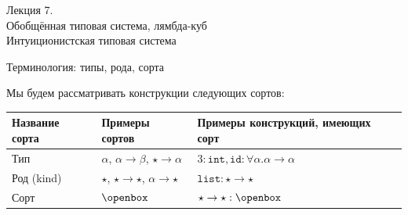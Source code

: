 \documentclass[aspectratio=169]{beamer}
\begin{document}
\newtheorem{dfn}{Определение}[section]
\newtheorem{nte}{Замечание}[section]

\newtheorem{axiom}{Аксиома}[section]
\newtheorem{thm}{Теорема}[section]
\newtheorem{lmm}[theorem]{Лемма}
\newtheorem{statement}{Утверждение}[section]
\newtheorem{oun_paragraph}{Пункт}[section]
\newtheorem{cons}{Следствие}[section]
\newtheorem*{exm}{Пример}

\newcommand{\comb}[1]{\operatorname{\bf{\textrm{#1}}}}
\newcommand{\func}[1]{\operatorname{#1}}
\newcommand{\reduction}[1]{{\color{OrangeRed}#1}}
\newcommand{\set}[1]{\left\{#1\right\}}

\def\from#1{\par \parbox{0.7\textwidth}{\par \hfill\raggedleft \it #1}} 

\begin{frame}{}
\begin{center}\Large Лекция 7.\\ Обобщённая типовая система, лямбда-куб\\Интуиционистская типовая система\end{center}
\end{frame}


\begin{frame}{Терминология: типы, рода, сорта}

Мы будем рассматривать конструкции следующих сортов:
\vspace{0.3cm}\begin{tabular}{lll}
Название сорта & Примеры сортов & Примеры конструкций, имеющих сорт\\\hline
Тип & $\alpha$, $\alpha\rightarrow\beta$, $\star\rightarrow\alpha$ & $3:\texttt{int}, \texttt{id}: \forall\alpha.\alpha\rightarrow\alpha$\\
Род (kind) & $\star$, $\star\rightarrow\star$, $\alpha\rightarrow\star$ & $\texttt{list}: \star\rightarrow\star$\\
Сорт & $\openbox$ & $\star\rightarrow\star : \openbox$
\end{tabular}

\end{frame}
\end{document}
